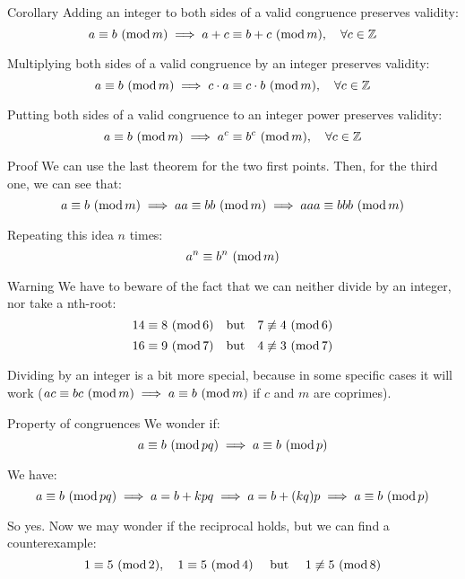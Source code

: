 \documentclass[a4paper]{article}
\begin{document}
\begin{parag}{Corollary}
    Adding an integer to both sides of a valid congruence preserves validity: 
    \[a \equiv b\ (\operatorname{mod} m) \implies a+c \equiv b+c\ (\operatorname{mod} m), \quad \forall c \in \mathbb{Z}\]
    
    Multiplying both sides of a valid congruence by an integer preserves validity:
    \[a \equiv b\ (\operatorname{mod} m) \implies c\cdot a \equiv c\cdot b\ (\operatorname{mod} m), \quad \forall c \in \mathbb{Z}\]

    Putting both sides of a valid congruence to an integer power preserves validity: 
    \[a \equiv b\ (\operatorname{mod} m) \implies a^c \equiv b^c\ (\operatorname{mod} m), \quad \forall c \in \mathbb{Z}\]
     
    \begin{subparag}{Proof}
        We can use the last theorem for the two first points. Then, for the third one, we can see that: 
        \[a \equiv b\ (\operatorname{mod} m) \implies aa \equiv bb\ (\operatorname{mod} m) \implies aaa \equiv bbb\ (\operatorname{mod} m)\]

        Repeating this idea $n$ times:
        \[a^n \equiv b^n\ (\operatorname{mod} m)\]
    \end{subparag}

    \begin{subparag}{Warning}
        We have to beware of the fact that we can neither divide by an integer, nor take a nth-root:
        \[14 \equiv 8\ (\operatorname{mod} 6) \quad \text{but} \quad 7 \not\equiv 4\ (\operatorname{mod} 6)\]
        \[16 \equiv 9\ (\operatorname{mod} 7) \quad \text{but} \quad 4 \not\equiv 3\ (\operatorname{mod} 7)\]

        Dividing by an integer is a bit more special, because in some specific cases it will work ($ac \equiv bc\ (\operatorname{mod} m) \implies a \equiv b\ (\operatorname{mod} m)$ if $c$ and $m$ are coprimes).
    \end{subparag}
\end{parag}

\begin{parag}{Property of congruences}
    We wonder if: 
    \[a \equiv b\ (\operatorname{mod} pq) \implies a \equiv b\ (\operatorname{mod} p)\]

    We have: 
    \[\congruent{a}{b}{pq} \implies a = b + kpq \implies a = b + \left(kq\right)p \implies \congruent{a}{b}{p}\]
    
    So yes. Now we may wonder if the reciprocal holds, but we can find a counterexample:
    \[1 \equiv 5\ (\operatorname{mod} 2), \quad 1 \equiv 5\ (\operatorname{mod} 4) \quad \text{ but } \quad 1 \not\equiv 5\ (\operatorname{mod} 8)\]

\end{parag}
\end{document}
